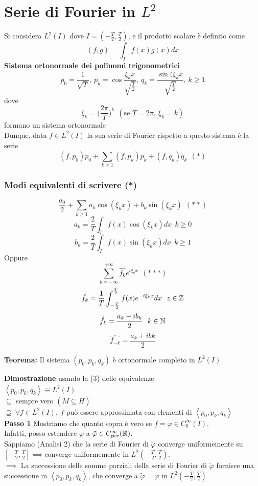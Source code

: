 
\section{Serie di Fourier in $L^2$}
Si considera $L^{2}(I)$ dove $I=(-\frac{T}{2},\frac{T}{2})$, e il prodotto scalare è definito come
\[(f,g)=\int_{I}^{} f(x)g(x)dx\]
\textbf{Sistema ortonormale dei polinomi trigonometrici}
\[p_0=\frac{1}{\sqrt{T} },\ p_k=\cos\frac{\xi_kx}{\sqrt{\frac{T}{2}} },\ q_k= \frac{\sin(\xi_kx}{\sqrt{\frac{T}{2}} },\ k\ge 1\]
dove 
\[\xi_k=\bigg(\frac{2\pi}{T}\bigg)^k\ \ (\text{se }T=2\pi,\ \xi_k=k)\]
formano un sistema ortonormale
\\Dunque, data $f\in L^{2}(I)$ la sua serie di Fourier rispetto a questo sistema è la serie
\[(f,p_0)p_0+\sum_{k\ge 1}^{} (f,p_k)p_k+(f,q_k)q_k\ \ (*)\]
\subsubsection{Modi equivalenti di scrivere (*)}
\[\frac{a_0}{2}+\sum_{k\ge 1}^{} a_k\cos(\xi_kx)+b_k\sin(\xi_kx)\ \ (* *)\]
\[a_k=\frac{2}{T}\int_{I}^{} f(x)\cos(\xi_kx)dx\ \ k\ge 0\]
\[b_k=\frac{2}{T}\int_{I}^{} f(x)\sin(\xi_kx)dx\ \ k\ge 1\]
Oppure 
\[\sum_{k=-\infty}^{+\infty} \hat{f_k}e^{i\xi_kx}\ \ (* * *)\]
\[\hat{f_k}=\frac{1}{T}\int_{-\frac{T}{2}}^{\frac{T}{2}} f(x)e^{-i\xi_kx}dx\ \ z\in \mathbb{Z}\]
\[\hat{f_k}= \frac{a_k-ib_k}{2}\ \ k\in \mathbb{N}\]
\[\hat{f_{-k}}=\frac{a_k+ibk}{2} \]
\begin{tcolorbox}
	\textbf{Teorema: }Il sistema $(p_0,p_k,q_k)$ è ortonormale completo in $L^{2}(I)$
\end{tcolorbox}
\textbf{Dimostrazione} usando la (3) delle equivalenze
\\$\overline{\left< p_0,p_k,q_k \right> }\equiv L^{2}(I)$ 
\\$\subseteq  $ sempre vero $(\overline{M}\subseteq  H)$ 
\\$\supseteq \ \forall f\in L^{2}(I),\ f$ può essere approssimata con elementi di $\left< p_0,p_k,q_k \right> $
\\\textbf{Passo 1} Mostriamo che quanto sopra è vero se $f=\varphi\in C_0^\infty(I)$.
\\Infatti, posso estendere $\varphi$ a $\tilde\varphi\in C_{\text{per}}^\infty(\mathbb{R})$.
\\Sappiamo (Analisi 2) che la serie di Fourier di $\tilde\varphi$ converge uniformemente su $[-\frac{T}{2},\frac{T}{2}]\implies $converge uniformemente in $L^{2}(-\frac{T}{2},\frac{T}{2})$.
\\$\implies $ La successione delle somme parziali della serie di Fourier di $\tilde\varphi$ fornisce una successione in $\left< p_0,p_k,q_k \right> $, che converge a $\tilde\varphi=\varphi$ in $L^{2}(-\frac{T}{2},\frac{T}{2})$
